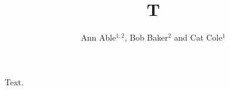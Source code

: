 \documentclass{iopart}
\begin{document}
\title{T}
\author{Ann Able$^{1,2}$, Bob Baker$^{2}$ and Cat Cole$^{1}$}
\address{$^1$ Institute of Physics, Univ A, City A}
\address{$^2$ ICFO, City B}
Text.
\end{document}
